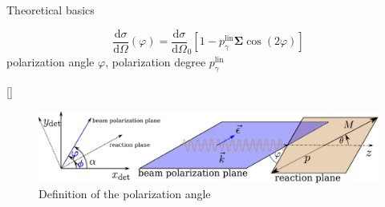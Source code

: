 \documentclass[11pt,aspectratio=169,dvipsnames]{beamer}
\newcommand{\thecolor}{black!70!blue}
\begin{document}
\begin{frame}{Theoretical basics}



		\begin{tcolorbox}[colback=blue!5,colframe=\thecolor,title=Beam asymmetry $\boldsymbol{\Sigma}$]
			$$\frac{\text{d}\sigma}{\text{d}\Omega}(\varphi)=\frac{\text{d}\sigma}{\text{d}\Omega}_0\left[1-p_\gamma^{\text{lin}}\boldsymbol{\Sigma}\cos(2\varphi)\right]$$
		polarization angle $\varphi$, polarization degree $p_\gamma^{\text{lin}}$
			\begin{flushright}
				{}
			\end{flushright}
		\end{tcolorbox}

\begin{figure}
	\centering
	\includegraphics[width=.8\linewidth]{angles.pdf}
	\caption*{Definition of the polarization angle}
\end{figure}
\end{frame}
\end{document}
